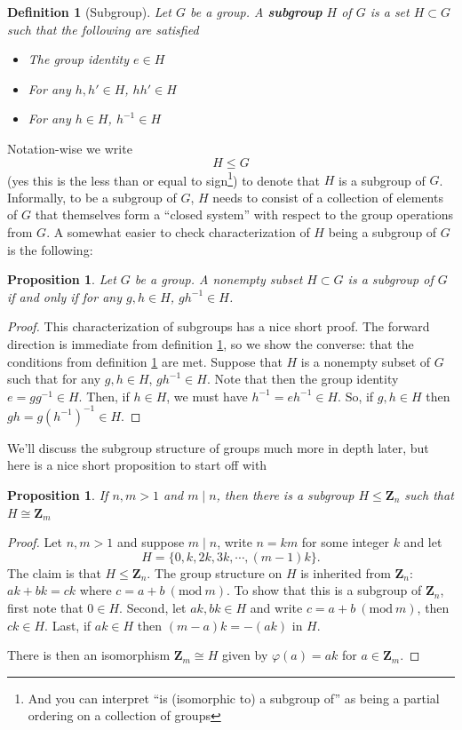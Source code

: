 \documentclass[12pt]{article}
\numberwithin{equation}{subsection}
\newtheorem{prop}[subsection]{Proposition}
\newtheorem{defn}[subsection]{Definition}
\theoremstyle{note}
\newcommand{\Mod}[1]{\ (\mathrm{mod}\ #1)}
\begin{document}
\begin{defn}[Subgroup] \label{subgroup}
	Let $G$ be a group. A \textbf{subgroup} $H$ of $G$ is a set $H\subset G$ such that the following are satisfied
	\begin{itemize}
		\item The group identity $e\in H$
		\item For any $h,h'\in H$, $h h'\in H$
		\item For any $h\in H$, $h^{-1}\in H$
	\end{itemize}
\end{defn}
Notation-wise we write \begin{equation} H\leq G \end{equation} (yes this is the less than or equal to sign\footnote{And you can interpret ``is (isomorphic to) a subgroup of'' as being a partial ordering on a collection of groups}) to denote that $H$ is a subgroup of $G$. Informally, to be a subgroup of $G$, $H$ needs to consist of a collection of elements of $G$ that themselves form a ``closed system'' with respect to the group operations from $G$. A somewhat easier to check characterization of $H$ being a subgroup of $G$ is the following:

\begin{prop}
	Let $G$ be a group. A nonempty subset $H\subset G$ is a subgroup of $G$ if and only if for any $g,h\in H$, $gh^{-1}\in H$.
\end{prop}
\begin{proof}
	This characterization of subgroups has a nice short proof. The forward direction is immediate from definition \ref{subgroup}, so we show the converse: that the conditions from definition \ref{subgroup} are met. Suppose that $H$ is a nonempty subset of $G$ such that for any $g,h\in H$, $gh^{-1}\in H$. Note that then the group identity $e=gg^{-1}\in H$. Then, if $h\in H$, we must have $h^{-1}=eh^{-1}\in H$. So, if $g,h\in H$ then $gh=g(h^{-1})^{-1}\in H$.    
\end{proof}

We'll discuss the subgroup structure of groups much more in depth later, but here is a nice short proposition to start off with
\begin{prop}
	If $n,m>1$ and $m\mid n$, then there is a subgroup $H\leq \mathbf{Z}_n$ such that $H\cong \mathbf{Z}_m$
\end{prop}

\begin{proof}
	Let $n,m>1$ and suppose $m\mid n$, write $n=km$ for some integer $k$ and let \[H=\{0,k,2k,3k,\cdots,(m-1)k\}.\] The claim is that $H\leq \mathbf{Z}_n$. The group structure on $H$ is inherited from $\mathbf{Z}_n$: $ak+bk= ck$ where $c=a+b\Mod{m}$. To show that this is a subgroup of $\mathbf{Z}_n$, first note that $0\in H$. Second, let $ak,bk\in H$ and write $c=a+b\Mod{m}$, then $ck\in H$. Last, if $ak\in H$ then $(m-a)k=-(ak)$ in $H$. 
	
	There is then an isomorphism $\mathbf{Z}_m\cong H$ given by $\varphi(a)=ak$ for $a\in \mathbf{Z}_m$.
\end{proof}
\end{document}
